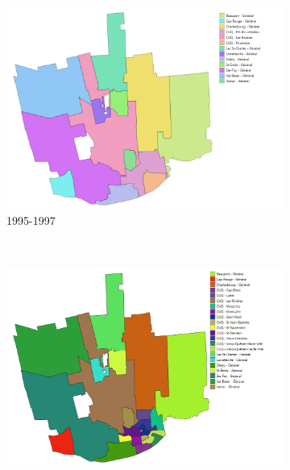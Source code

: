 \begin{figure}[ht]
  \centering
  \begin{subfigure}[t]{0.5\textwidth}
    \centering
    \includegraphics[width=0.9\linewidth]{images/geographie_code_urbanisme_1995-1997.png}
    \caption{1995-1997}
  \end{subfigure}~
  \begin{subfigure}[t]{0.5\textwidth}
    \centering
    \includegraphics[width=0.9\linewidth]{images/geographie_code_urbanisme_1997-2009.png}

\end{subfigure}
\end{figure}
